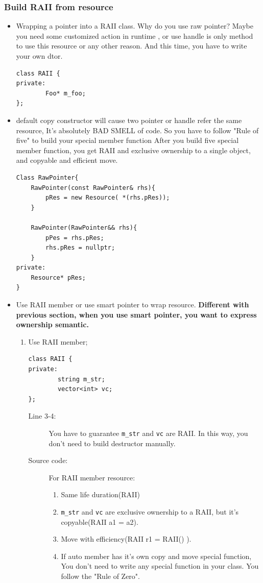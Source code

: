 \documentclass[a4paper,11pt,twoside]{book}
\begin{document}
\subsubsection{Build RAII from resource}
\begin{itemize}
		\item Wrapping a pointer into a RAII class. Why do you use raw pointer? Maybe you need some customized action in runtime , or use handle is only method to use this resource or any other reason. And this time, you have to write your own dtor.
\begin{lstlisting}[numbers=none]
class RAII {
private:
		Foo* m_foo;
};
\end{lstlisting}
    \item default copy constructor will cause two pointer or handle refer the same resource, It's absolutely BAD SMELL of code. So you have to follow "Rule of five" to build your special member function After you build five special member function, you get RAII and exclusive ownership to a single object, and copyable and efficient move.
			
\begin{lstlisting}[numbers=none]
Class RawPointer{
	RawPointer(const RawPointer& rhs){
		pRes = new Resource( *(rhs.pRes));
	}
				
	RawPointer(RawPointer&& rhs){
		pPes = rhs.pRes;
		rhs.pRes = nullptr;
	}
private:
	Resource* pRes;
}
\end{lstlisting}

		\item Use RAII member or use smart pointer to wrap resource. \textbf{Different with previous section, when you use smart pointer, you want to express ownership semantic.}

	\begin{enumerate}
		\item Use RAII member; 
\begin{lstlisting}[]
class RAII {
private:
		string m_str;
		vector<int> vc;
};
\end{lstlisting}
			\begin{description}
				\item[Line 3-4:] You have to guarantee \texttt{m\_str} and \texttt{vc} are RAII.  In this way, you don't need to build destructor manually.
				
				\item[Source code:] For RAII member resource:
				\begin{enumerate}
					\item Same life duration(RAII)
					\item \texttt{m\_str} and \texttt{vc} are exclusive ownership to a RAII, but it's copyable(RAII a1 = a2).
					\item Move with efficiency(RAII r1 = RAII() ). 
					\item If auto member has it's own copy and move special function, You don't need to write any special function in your class. You follow the "Rule of Zero".
				\end{enumerate}
			\end{description}
		

\end{enumerate}
\end{itemize}
\end{document}

